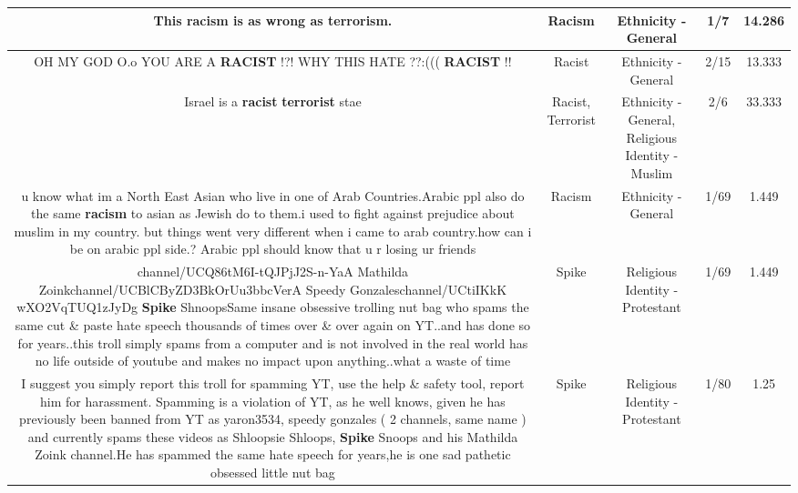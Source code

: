 \documentclass[11pt]{article}
\newlength\mylength
\begin{document}
\begin{center}
\begin{longtable}{|C{.65\mylength}|C{.30\mylength}|C{.12\mylength}|C{.12\mylength}|C{.12\mylength}|}
  \small This \textbf{racism} is as wrong as terrorism.\normalsize   & Racism & Ethnicity - General & 1/7 & 14.286 \\  \hline
  \small OH MY GOD O.o YOU ARE A \textbf{RACIST} !?! WHY THIS HATE ??:((( \textbf{RACIST} !!\normalsize   & Racist & Ethnicity - General & 2/15 & 13.333 \\  \hline
  \small Israel is a \textbf{racist} \textbf{terrorist} stae\normalsize   & Racist, Terrorist & Ethnicity - General, Religious Identity - Muslim & 2/6 & 33.333 \\  \hline
  \small u know what im a North East Asian who live in one of Arab Countries.Arabic ppl also do the same \textbf{racism} to asian as Jewish do to them.i used to fight against prejudice about muslim in my country. but things went very different when i came to arab country.how can i be on arabic ppl side.? Arabic ppl should know that u r losing ur friends\normalsize   & Racism & Ethnicity - General & 1/69 & 1.449 \\  \hline
  \small channel/UCQ86tM6I-tQJPjJ2S-n-Y­aA Mathilda Zoinkchannel/UCBlCByZD3BkOrUu3bbcV­erA Speedy Gonzaleschannel/UCtiIKkK wXO2VqTUQ1zJy­Dg \textbf{Spike} ShnoopsSame insane obsessive trolling nut bag who spams the same cut \& paste hate speech thousands of times over \& over again on YT..and has done so for years..this troll simply spams from a computer and is not involved in the real world has no life outside of youtube and makes no impact upon anything..what a waste of time\normalsize   & Spike & Religious Identity - Protestant & 1/69 & 1.449 \\  \hline
  \small I suggest you simply report this troll for spamming YT, use the help \& safety tool, report him for harassment. Spamming is a violation of YT, as he well knows, given he has previously been banned from YT as yaron3534, speedy gonzales ( 2 channels, same name ) and  currently spams these videos as Shloopsie Shloops, \textbf{Spike} Snoops and his  Mathilda Zoink channel.He has spammed the same hate speech for years,he is one sad pathetic obsessed little nut bag\normalsize   & Spike & Religious Identity - Protestant & 1/80 & 1.25 \\  \hline

\end{longtable}
\end{center}
\end{document}
